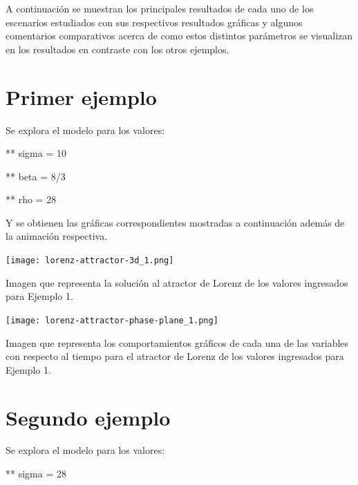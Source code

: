 \documentclass{article} %
\begin{document}
\vspace{0.5 cm}

A continuación se muestran los principales resultados de cada uno de los escenarios estudiados con sus respectivos resultados gráficas y algunos comentarios comparativos acerca de como estos distintos parámetros se visualizan en los resultados en contraste con los otros ejemplos. 

\section{Primer ejemplo}

Se explora el modelo para los valores:

\vspace{0.5 cm}

** sigma = 10

** beta = 8/3 

** rho = 28 

\vspace{0.5 cm}

Y se obtienen las gráficas correspondientes mostradas a continuación además de la animación respectiva.

\begin{center}

	\texttt{[image: lorenz-attractor-3d\_1.png]}

Imagen que representa la solución al atractor de Lorenz de los valores ingresados para Ejemplo 1.

\end{center}


\begin{center}

	\texttt{[image: lorenz-attractor-phase-plane\_1.png]}

Imagen que representa los comportamientos gráficos de cada una de las variables con respecto al tiempo para el atractor de Lorenz de los valores ingresados para Ejemplo 1.

\end{center}

\section{Segundo ejemplo}

Se explora el modelo para los valores:

\vspace{0.5 cm}

** sigma = 28
\end{document}
